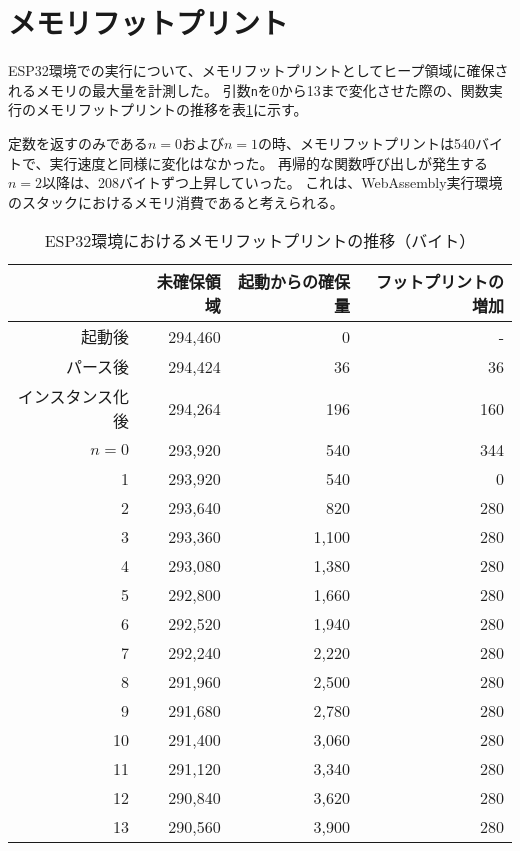 \section{メモリフットプリント}

ESP32環境での実行について、メモリフットプリントとしてヒープ領域に確保されるメモリの最大量を計測した。
引数\verb|n|を0から13まで変化させた際の、関数実行のメモリフットプリントの推移を表\ref{tab:heap_size}に示す。

定数を返すのみである$n=0$および$n=1$の時、メモリフットプリントは540バイトで、実行速度と同様に変化はなかった。
再帰的な関数呼び出しが発生する$n=2$以降は、208バイトずつ上昇していった。
これは、WebAssembly実行環境のスタックにおけるメモリ消費であると考えられる。

\begin{table}[htbp]
  \caption{ESP32環境におけるメモリフットプリントの推移（バイト）}
  \label{tab:heap_size}
  \begin{center}
    \begin{tabular}{rrrr}
      \hline
      & 未確保領域 & 起動からの確保量 & フットプリントの増加 \\ \hline \hline
      起動後      & 294,460 & 0 & - \\ \hline
      パース後     & 294,424 & 36 & 36 \\ \hline
      インスタンス化後 & 294,264  & 196 & 160 \\ \hline
      $n=0$  & 293,920 &   540 & 344 \\ \hline
          1  & 293,920 &   540 &   0 \\ \hline
          2  & 293,640 &   820 & 280 \\ \hline
          3  & 293,360 & 1,100 & 280 \\ \hline
          4  & 293,080 & 1,380 & 280 \\ \hline
          5  & 292,800 & 1,660 & 280 \\ \hline
          6  & 292,520 & 1,940 & 280 \\ \hline
          7  & 292,240 & 2,220 & 280 \\ \hline
          8  & 291,960 & 2,500 & 280 \\ \hline
          9  & 291,680 & 2,780 & 280 \\ \hline
          10 & 291,400 & 3,060 & 280 \\ \hline
          11 & 291,120 & 3,340 & 280 \\ \hline
          12 & 290,840 & 3,620 & 280 \\ \hline
          13 & 290,560 & 3,900 & 280 \\ \hline
    \end{tabular}
  \end{center}
\end{table}
